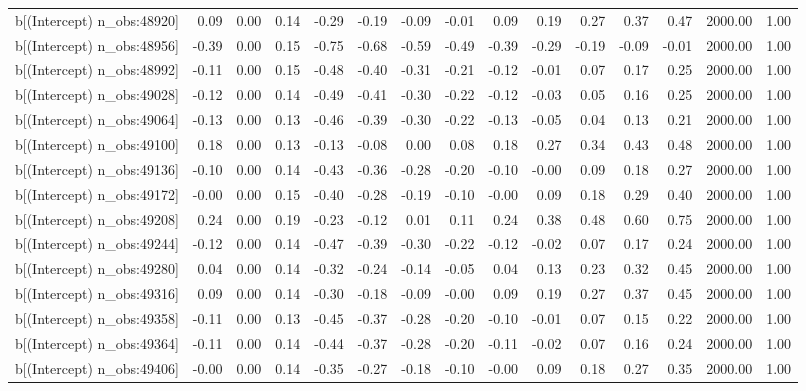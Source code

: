 \begin{table}[ht]
\begin{tabular}{rrrrrrrrrrrrrrr}
  b[(Intercept) n\_obs:48920] & 0.09 & 0.00 & 0.14 & -0.29 & -0.19 & -0.09 & -0.01 & 0.09 & 0.19 & 0.27 & 0.37 & 0.47 & 2000.00 & 1.00 \\ 
  b[(Intercept) n\_obs:48956] & -0.39 & 0.00 & 0.15 & -0.75 & -0.68 & -0.59 & -0.49 & -0.39 & -0.29 & -0.19 & -0.09 & -0.01 & 2000.00 & 1.00 \\ 
  b[(Intercept) n\_obs:48992] & -0.11 & 0.00 & 0.15 & -0.48 & -0.40 & -0.31 & -0.21 & -0.12 & -0.01 & 0.07 & 0.17 & 0.25 & 2000.00 & 1.00 \\ 
  b[(Intercept) n\_obs:49028] & -0.12 & 0.00 & 0.14 & -0.49 & -0.41 & -0.30 & -0.22 & -0.12 & -0.03 & 0.05 & 0.16 & 0.25 & 2000.00 & 1.00 \\ 
  b[(Intercept) n\_obs:49064] & -0.13 & 0.00 & 0.13 & -0.46 & -0.39 & -0.30 & -0.22 & -0.13 & -0.05 & 0.04 & 0.13 & 0.21 & 2000.00 & 1.00 \\ 
  b[(Intercept) n\_obs:49100] & 0.18 & 0.00 & 0.13 & -0.13 & -0.08 & 0.00 & 0.08 & 0.18 & 0.27 & 0.34 & 0.43 & 0.48 & 2000.00 & 1.00 \\ 
  b[(Intercept) n\_obs:49136] & -0.10 & 0.00 & 0.14 & -0.43 & -0.36 & -0.28 & -0.20 & -0.10 & -0.00 & 0.09 & 0.18 & 0.27 & 2000.00 & 1.00 \\ 
  b[(Intercept) n\_obs:49172] & -0.00 & 0.00 & 0.15 & -0.40 & -0.28 & -0.19 & -0.10 & -0.00 & 0.09 & 0.18 & 0.29 & 0.40 & 2000.00 & 1.00 \\ 
  b[(Intercept) n\_obs:49208] & 0.24 & 0.00 & 0.19 & -0.23 & -0.12 & 0.01 & 0.11 & 0.24 & 0.38 & 0.48 & 0.60 & 0.75 & 2000.00 & 1.00 \\ 
  b[(Intercept) n\_obs:49244] & -0.12 & 0.00 & 0.14 & -0.47 & -0.39 & -0.30 & -0.22 & -0.12 & -0.02 & 0.07 & 0.17 & 0.24 & 2000.00 & 1.00 \\ 
  b[(Intercept) n\_obs:49280] & 0.04 & 0.00 & 0.14 & -0.32 & -0.24 & -0.14 & -0.05 & 0.04 & 0.13 & 0.23 & 0.32 & 0.45 & 2000.00 & 1.00 \\ 
  b[(Intercept) n\_obs:49316] & 0.09 & 0.00 & 0.14 & -0.30 & -0.18 & -0.09 & -0.00 & 0.09 & 0.19 & 0.27 & 0.37 & 0.45 & 2000.00 & 1.00 \\ 
  b[(Intercept) n\_obs:49358] & -0.11 & 0.00 & 0.13 & -0.45 & -0.37 & -0.28 & -0.20 & -0.10 & -0.01 & 0.07 & 0.15 & 0.22 & 2000.00 & 1.00 \\ 
  b[(Intercept) n\_obs:49364] & -0.11 & 0.00 & 0.14 & -0.44 & -0.37 & -0.28 & -0.20 & -0.11 & -0.02 & 0.07 & 0.16 & 0.24 & 2000.00 & 1.00 \\ 
  b[(Intercept) n\_obs:49406] & -0.00 & 0.00 & 0.14 & -0.35 & -0.27 & -0.18 & -0.10 & -0.00 & 0.09 & 0.18 & 0.27 & 0.35 & 2000.00 & 1.00 \\ 

\end{tabular}
\end{table}
